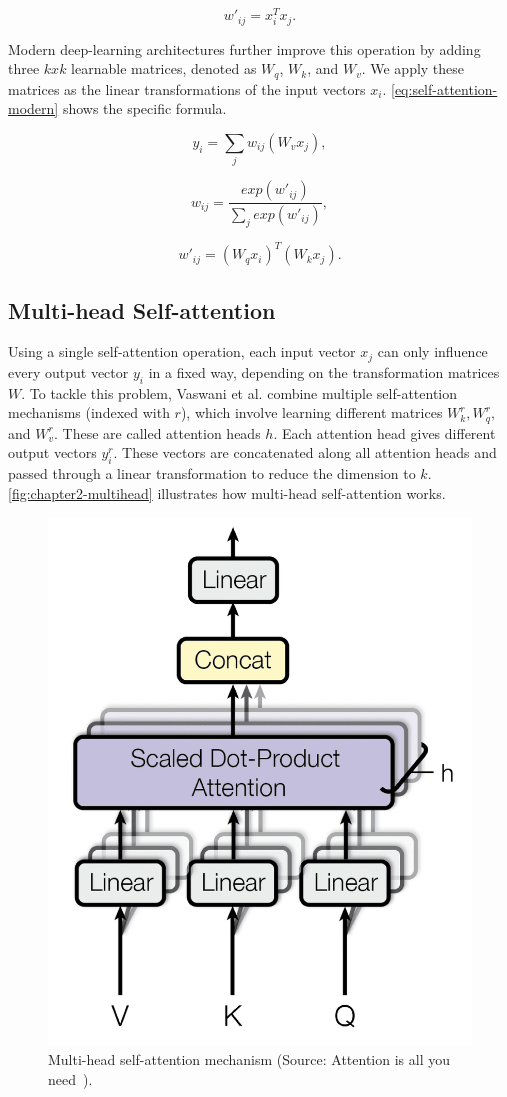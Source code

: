 \begin{equation}
w'_{ij} = x^T_ix_j.
\label{eq:self-attention-weight}
\end{equation}

Modern deep-learning architectures further improve this operation by adding three $k x k$ learnable matrices, denoted as $W_q$, $W_k$, and $W_v$. We apply these matrices as the linear transformations of the input vectors $x_i$. \autoref{eq:self-attention-modern} shows the specific formula.

\begin{equation}
y_i = \sum_{j} w_{ij} (W_v x_j),
\label{eq:self-attention-modern}
\end{equation}

\begin{equation}
w_{ij} = \dfrac{exp(w'_{ij})}{\sum_{j} exp(w'_{ij})},
\end{equation}

\begin{equation}
w'_{ij} = (W_qx_i)^T(W_kx_j).
\end{equation}


\subsection{Multi-head Self-attention}
Using a single self-attention operation, each input vector $x_j$ can only influence every output vector $y_i$ in a fixed way, depending on the transformation matrices $W$. To tackle this problem, Vaswani et al.\cite{Vaswani-NeurIPS2017-Attention} combine multiple self-attention mechanisms (indexed with $r$), which involve learning different matrices $W^r_k, W^r_q,$ and $W^r_v$. These are called attention heads $h$. Each attention head gives different output vectors $y^r_i$. These vectors are concatenated along all attention heads and passed through a linear transformation to reduce the dimension to $k$. \autoref{fig:chapter2-multihead} illustrates how multi-head self-attention works.

\begin{figure}[h!]
    \centering
    \includegraphics[width=0.3\linewidth]{content/resources/images/background/multihead.png}
    \caption{Multi-head self-attention mechanism (Source: Attention is all you need~\cite{Vaswani-NeurIPS2017-Attention}).}
    \label{fig:chapter2-multihead}
\end{figure}

